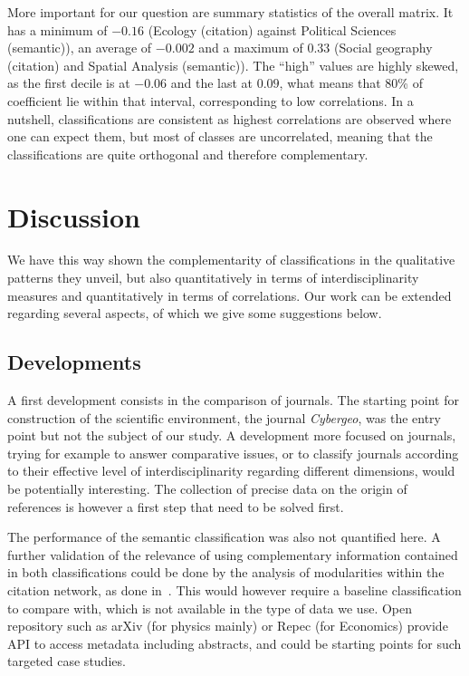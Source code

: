 More important for our question are summary statistics of the overall matrix. It has a minimum of $-0.16$ (Ecology (citation) against Political Sciences (semantic)), an average of $-0.002$ and a maximum of $0.33$ (Social geography (citation) and Spatial Analysis (semantic)). The ``high'' values are highly skewed, as the first decile is at $-0.06$ and the last at $0.09$, what means that 80\% of coefficient lie within that interval, corresponding to low correlations. In a nutshell, classifications are consistent as highest correlations are observed where one can expect them, but most of classes are uncorrelated, meaning that the classifications are quite orthogonal and therefore complementary.



\section*{Discussion}
\label{sec:discussion}

We have this way shown the complementarity of classifications in the qualitative patterns they unveil, but also quantitatively in terms of interdisciplinarity measures and quantitatively in terms of correlations. Our work can be extended regarding several aspects, of which we give some suggestions below.



\subsection*{Developments}


A first development consists in the comparison of journals. The starting point for construction of the scientific environment, the journal \textit{Cybergeo}, was the entry point but not the subject of our study. A development more focused on journals, trying for example to answer comparative issues, or to classify journals according to their effective level of interdisciplinarity regarding different dimensions, would be potentially interesting. The collection of precise data on the origin of references is however a first step that need to be solved first.


The performance of the semantic classification was also not quantified here. A further validation of the relevance of using complementary information contained in both classifications could be done by the analysis of modularities within the citation network, as done in~\cite{bergeaud2017classifying}. This would however require a baseline classification to compare with, which is not available in the type of data we use. Open repository such as arXiv (for physics mainly) or Repec (for Economics) provide API to access metadata including abstracts, and could be starting points for such targeted case studies.


